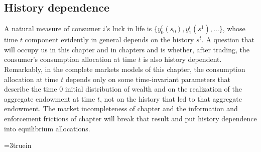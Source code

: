 \subsection{History dependence}
  A natural measure of consumer
$i$'s luck in life is  $\{y^i_0(s_0), y^i_1(s^1), \ldots \}$, whose time $t$ component
evidently in general depends on the history $s^t$. A
question that will occupy us in this chapter and in chapters
 and
 is whether, after trading, the consumer's
consumption allocation at time $t$ is also history dependent.  Remarkably, in
the complete markets models of this chapter, the consumption
allocation  at time $t$  depends only on some time-invariant parameters that describe the time $0$  initial distribution of wealth and
on the realization of the aggregate
endowment  at time $t$,  not  on the  history that led to that aggregate endowment.
 The market incompleteness of chapter
 and the  information and enforcement frictions of
chapter  will break that result and put
history dependence into equilibrium allocations.



\centerline{\epsfxsize=3truein} \caption{The
commodity space with Arrow securities.  At date $t=2$, there are
trades in time $3$ goods for only those time $t=3$ nodes that can
be reached from the realized time $t=2$ history $(0,0, 1)$.}
\endfigure

